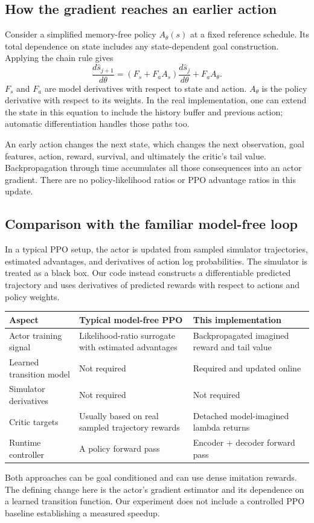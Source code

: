 \documentclass[11pt,a4paper]{article}
\begin{document}
\subsection{How the gradient reaches an earlier action}
Consider a simplified memory-free policy $A_\theta(s)$ at a fixed reference
schedule. Its total dependence on state includes any state-dependent goal
construction. Applying the chain rule gives
\begin{equation}\label{eq:chain}
\frac{d\hat s_{j+1}}{d\theta}
=\left(F_s+F_a A_s\right)\frac{d\hat s_j}{d\theta}
+F_a A_\theta.
\end{equation}
$F_s$ and $F_a$ are model derivatives with respect to state and action.
$A_\theta$ is the policy derivative with respect to its weights. In the real
implementation, one can extend the state in this equation to include the history
buffer and previous action; automatic differentiation handles those paths too.

An early action changes the next state, which changes the next observation,
goal features, action, reward, survival, and ultimately the critic's tail value.
Backpropagation through time accumulates all those consequences into an actor
gradient. There are no policy-likelihood ratios or PPO advantage ratios in this
update.

\subsection{Comparison with the familiar model-free loop}
In a typical PPO setup, the actor is updated from sampled simulator trajectories,
estimated advantages, and derivatives of action log probabilities. The simulator
is treated as a black box. Our code instead constructs a differentiable predicted
trajectory and uses derivatives of predicted rewards with respect to actions
and policy weights.

\begin{tabularx}{\linewidth}{@{}lXX@{}}
\toprule
Aspect & Typical model-free PPO & This implementation\\
\midrule
Actor training signal & Likelihood-ratio surrogate with estimated advantages &
Backpropagated imagined reward and tail value\\
Learned transition model & Not required & Required and updated online\\
Simulator derivatives & Not required & Not required\\
Critic targets & Usually based on real sampled trajectory rewards &
Detached model-imagined lambda returns\\
Runtime controller & A policy forward pass & Encoder + decoder forward pass\\
\bottomrule
\end{tabularx}
Both approaches can be goal conditioned and can use dense imitation rewards.
The defining change here is the actor's gradient estimator and its dependence
on a learned transition function. Our experiment does not include a controlled
PPO baseline establishing a measured speedup.
\end{document}
